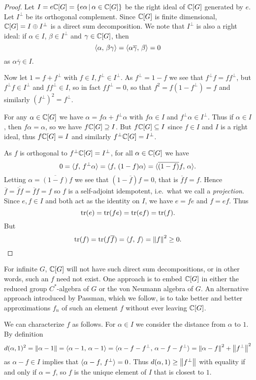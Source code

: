 \begin{proof}
    Let $I = e \mathbb{C}[G] = \left\{  e \alpha  \,\middle|\, \alpha \in \mathbb{C}[G] \right\}$ be the right ideal of $\mathbb{C}[G]$ generated by $e$.
    Let $I^\perp$ be its orthogonal complement.
    Since $\mathbb{C}[G]$ is finite dimensional, $\mathbb{C}[G] = I \oplus I^\perp$ is a direct sum decomposition.
    We note that $I^\perp$ is also a right ideal: if $\alpha \in I$, $\beta \in I^\perp$ and $\gamma \in \mathbb{C}[G]$, then \[
        \langle \alpha, \, \beta \gamma \rangle = \langle \alpha \overline{\gamma}, \, \beta \rangle = 0
    \] as $\alpha \overline{\gamma} \in I$.

    Now let $1 = f + f^\perp$ with $f \in I, f^\perp \in I^\perp$.
    As $f^\perp = 1 - f$ we see that $f^\perp f = f f^\perp$, but $f^\perp f \in I^\perp$ and $f f^\perp \in I$, so in fact $f f^\perp = 0$, so that $f^2 = f(1 - f^\perp) = f$ and similarly $(f^\perp)^2 = f^\perp$.

    For any $\alpha \in \mathbb{C}[G]$ we have $\alpha = f \alpha + f^\perp \alpha$ with $f \alpha \in I$ and $f^\perp \alpha \in I^\perp$.
    Thus if $\alpha \in I$, then $f \alpha = \alpha$, so we have $f \mathbb{C}[G] \supseteq I$.
    But $f \mathbb{C}[G] \subseteq I$ since $f \in I$ and $I$ is a right ideal, thus $f \mathbb{C}[G] = I$ and similarly $f^\perp \mathbb{C}[G] = I^\perp$.

    As $f$ is orthogonal to $f^\perp \mathbb{C}[G] = I^\perp$, for all $\alpha \in \mathbb{C}[G]$ we have \[
        0 = \langle f, \, f^\perp \alpha \rangle = \langle f, \, (1-f)\alpha \rangle = \langle \overline{(1-f)} f, \, \alpha \rangle.
    \]
    Letting $\alpha = \overline{(1-f)} f$ we see that $(1 - \overline{f}) f = 0$, that is $\overline{f} f = f$.
    Hence $\overline{f} = \overline{\overline{f} f} = \overline{f} f = f$ so $f$ is a self-adjoint idempotent, i.e.\ what we call a \emph{projection}.
    Since $e, f \in I$ and both act as the identity on $I$, we have $e = fe$ and $f = ef$.
    Thus \[
        \operatorname{tr}(e) = \operatorname{tr}(fe) = \operatorname{tr}(ef) = \operatorname{tr}(f).
    \]
    But \[
        \operatorname{tr}(f) = \operatorname{tr}(f \overline{f}) = \langle f, \, f \rangle = \left\lVert f \right\rVert^2 \geq 0.
    \]
\end{proof}

For infinite $G$, $\mathbb{C}[G]$ will not have such direct sum decompositions, or in other words, such an $f$ need not exist.
One approach is to embed $\mathbb{C}[G]$ in either the reduced group $C^*$-algebra of $G$ or the von Neumann algebra of $G$.
An alternative approach introduced by Passman, which we follow, is to take better and better approximations $f_n$ of such an element $f$ without ever leaving $\mathbb{C}[G]$.

We can characterize $f$ as follows.
For $\alpha \in I$ we consider the distance from $\alpha$ to $1$.
By definition \[
    d(\alpha, 1)^2 = \left\lVert \alpha - 1 \right\rVert = \langle \alpha - 1, \, \alpha - 1 \rangle = \langle \alpha - f - f^\perp, \, \alpha - f - f^\perp \rangle = \left\lVert \alpha - f \right\rVert^2 + \left\lVert f^\perp \right\rVert^2
\] as $\alpha - f \in I$ implies that $\langle \alpha - f, \, f^\perp \rangle = 0$.
Thus $d(\alpha, 1) \geq \left\lVert f^\perp \right\rVert$ with equality if and only if $\alpha = f$, so $f$ is the unique element of $I$ that is closest to $1$.

